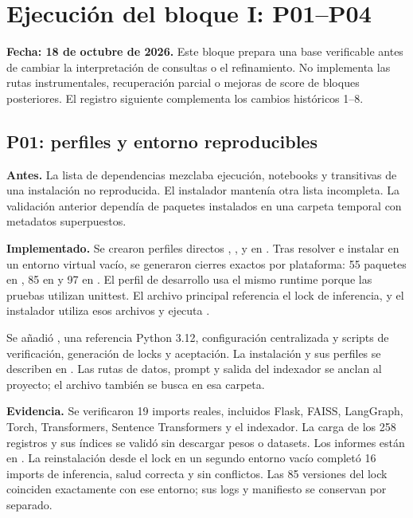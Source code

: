 \section{Ejecución del bloque I: P01--P04}
\label{sec:bloque1}
\textbf{Fecha: 18 de octubre de 2026.} Este bloque prepara una base verificable
antes de cambiar la interpretación de consultas o el refinamiento. No implementa
las rutas instrumentales, recuperación parcial o mejoras de score de bloques
posteriores. El registro siguiente complementa los cambios históricos 1--8.

\subsection{P01: perfiles y entorno reproducibles}
\textbf{Antes.} La lista de dependencias mezclaba ejecución, notebooks y
transitivas de una instalación no reproducida. El instalador mantenía otra
lista incompleta. La validación anterior dependía de paquetes instalados en
una carpeta temporal con metadatos superpuestos.

\textbf{Implementado.} Se crearon perfiles directos ,
,  y  en .
Tras resolver e instalar en un entorno virtual vacío, se generaron cierres
exactos por plataforma: 55 paquetes en , 85 en
 y 97 en . El perfil de desarrollo usa
el mismo runtime porque las pruebas utilizan unittest. El archivo principal
 referencia el lock de inferencia, y el instalador
utiliza esos archivos y ejecuta .

Se añadió , una referencia Python 3.12, configuración
centralizada y scripts de verificación, generación de locks y aceptación.
La instalación y sus perfiles se describen en . Las rutas
de datos, prompt y salida del indexador se anclan al proyecto; el archivo
 también se busca en esa carpeta.

\textbf{Evidencia.} Se verificaron 19 imports reales, incluidos Flask, FAISS,
LangGraph, Torch, Transformers, Sentence Transformers y el indexador. La carga
de los 258 registros y sus índices se validó sin descargar pesos o datasets.
Los informes están en . La reinstalación desde el
lock en un segundo entorno vacío completó 16 imports de inferencia, salud
correcta y  sin conflictos. Las 85 versiones del lock coinciden
exactamente con ese entorno; sus logs y manifiesto se conservan por separado.

